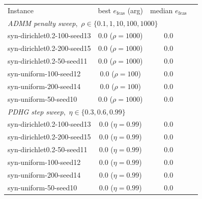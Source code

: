 \begin{tabular}{lccc}
\toprule
Instance & best $e_{\mathrm{feas}}$ (arg) & median $e_{\mathrm{feas}}$ \\
\multicolumn{3}{l}{\emph{ADMM penalty sweep},\ $\rho\in\{0.1,1,10,100,1000\}$} \\
\midrule
syn-dirichlet0.2-100-seed13 & 0.0 ($\rho=1000$) & 0.0 \\
syn-dirichlet0.2-200-seed15 & 0.0 ($\rho=1000$) & 0.0 \\
syn-dirichlet0.2-50-seed11 & 0.0 ($\rho=1000$) & 0.0 \\
syn-uniform-100-seed12 & 0.0 ($\rho=100$) & 0.0 \\
syn-uniform-200-seed14 & 0.0 ($\rho=100$) & 0.0 \\
syn-uniform-50-seed10 & 0.0 ($\rho=1000$) & 0.0 \\
\midrule
\multicolumn{3}{l}{\emph{PDHG step sweep},\ $\eta\in\{0.3,0.6,0.99\}$} \\
\midrule
syn-dirichlet0.2-100-seed13 & 0.0 ($\eta=0.99$) & 0.0 \\
syn-dirichlet0.2-200-seed15 & 0.0 ($\eta=0.99$) & 0.0 \\
syn-dirichlet0.2-50-seed11 & 0.0 ($\eta=0.99$) & 0.0 \\
syn-uniform-100-seed12 & 0.0 ($\eta=0.99$) & 0.0 \\
syn-uniform-200-seed14 & 0.0 ($\eta=0.99$) & 0.0 \\
syn-uniform-50-seed10 & 0.0 ($\eta=0.99$) & 0.0 \\
\bottomrule
\end{tabular}